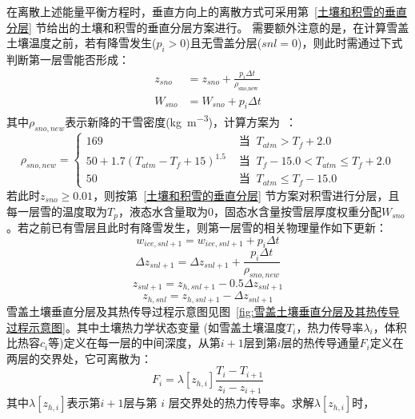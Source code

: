 在离散上述能量平衡方程时，垂直方向上的离散方式可采用第~\ref{土壤和积雪的垂直分层} 节给出的土壤和积雪的垂直分层方案进行。
需要额外注意的是，在计算雪盖土壤温度之前，若有降雪发生($p_i>0$)且无雪盖分层($snl=0$)，则此时需通过下式判断第一层雪能否形成：
\begin{equation}
\begin{aligned}
z_{sno} &= z_{sno}+\frac{p_{i} \Delta t}{\rho_{\text {sno,new }}} \\[1ex] 
W_{sno} &= W_{sno}+p_{i} \Delta t
\end{aligned}
\end{equation}
其中$\rho_{sno,new}$表示新降的干雪密度(\unit{kg.m^{-3}})，计算方案为~\citep{anderson1976point}：
\begin{equation}
\rho_{sno, new}=\begin{cases}
169 & \text { 当 }\ T_{atm}>T_{f}+2.0 \\ 
50+1.7\left(T_{atm}-T_{f}+15\right)^{1.5}  & \text { 当 }\ T_{f}-15.0<T_{atm} \leq T_{f}+2.0 \\ 
50 & \text { 当 }\ T_{atm} \leq T_{f}-15.0
\end{cases}
\end{equation}
若此时$z_{sno} \geq 0.01$，则按第~\ref{土壤和积雪的垂直分层} 节方案对积雪进行分层，且每一层雪的温度取为$T_p$，液态水含量取为0，固态水含量按雪层厚度权重分配$W_{sno}$。若之前已有雪层且此时有降雪发生，则第一层雪的相关物理量作如下更新：
\begin{equation}
w_{ice, snl+1}=w_{ice, snl+1}+p_{i} \Delta t
\end{equation}
\begin{equation}
\Delta z_{snl+1}=\Delta z_{snl+1}+\frac{p_{i} \Delta t}{\rho_{sno, new}}
\end{equation}
\begin{equation}
z_{snl+1}=z_{h, snl+1}-0.5 \Delta z_{snl+1}
\end{equation}
\begin{equation}
z_{h, snl}=z_{h, snl+1}-\Delta z_{snl+1}
\end{equation}
雪盖土壤垂直分层及其热传导过程示意图见图~\ref{fig:雪盖土壤垂直分层及其热传导过程示意图}。其中土壤热力学状态变量
(如雪盖土壤温度$T_i$，热力传导率$\lambda_i$，体积比热容$c_i$等)定义在每一层的中间深度，从第$i+1$层到第$i$层的热传导通量$F_i$定义在两层的交界处，它可离散为：
\begin{equation}
F_{i}=\lambda\left[z_{h, i}\right] \frac{T_{i}-T_{i+1}}{z_{i}-z_{i+1}}
\end{equation}
其中$\lambda\left[z_{h,i}\right]$表示第$i+1$层与第 $i$ 层交界处的热力传导率。求解$\lambda\left[z_{h,i}\right]$时，
